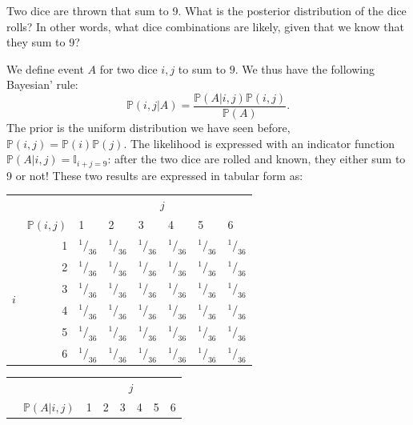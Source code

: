 \documentclass{article}
\begin{document}
\begin{testexample}
    Two dice are thrown that sum to 9. What is the posterior distribution of the dice rolls? In other words, what dice combinations are likely, given that we know that they sum to 9?
    
    We define event $A$ for two dice $i,j$ to sum to $9$. We thus have the following Bayesian' rule:
    \begin{equation}
        \mathbb{P}(i,j|A) = \frac{ \mathbb{P}(A|i,j)\mathbb{P}(i,j)}{\mathbb{P}(A)}.
    \end{equation}
    The prior is the uniform distribution we have seen before, $\mathbb{P}(i,j)=\mathbb{P}(i)\mathbb{P}(j)$. The likelihood is expressed with an indicator function $\mathbb{P}(A|i,j)=\mathbb{I}_{i+j=9}$: after the two dice are rolled and known, they either sum to 9 or not! These two results are expressed in tabular form as:
    \begin{center}
    \hfill
\begin{tabular}{@{}lr|llllll}
\toprule
 & & \multicolumn{6}{c}{$j$} \\ 
 &$\mathbb{P}(i,j)$ & 1 & 2 & 3 & 4 & 5 & 6 \\ \hline
\multirow{6}{*}{$i$} & 1 & $^{1\!}/_{\! 36}$ & $^{1\!}/_{\! 36}$ & $^{1\!}/_{\! 36}$ & $^{1\!}/_{\! 36}$ & $^{1\!}/_{\! 36}$ & $^{1\!}/_{\! 36}$ \\
 & 2 & $^{1\!}/_{\! 36}$ & $^{1\!}/_{\! 36}$ & $^{1\!}/_{\! 36}$ & $^{1\!}/_{\! 36}$ & $^{1\!}/_{\! 36}$ & $^{1\!}/_{\! 36}$ \\
 & 3 & $^{1\!}/_{\! 36}$ & $^{1\!}/_{\! 36}$ & $^{1\!}/_{\! 36}$ & $^{1\!}/_{\! 36}$ & $^{1\!}/_{\! 36}$ & $^{1\!}/_{\! 36}$ \\
 & 4 & $^{1\!}/_{\! 36}$ & $^{1\!}/_{\! 36}$ & $^{1\!}/_{\! 36}$ & $^{1\!}/_{\! 36}$ & $^{1\!}/_{\! 36}$ & $^{1\!}/_{\! 36}$ \\
 & 5 & $^{1\!}/_{\! 36}$ & $^{1\!}/_{\! 36}$ & $^{1\!}/_{\! 36}$ & $^{1\!}/_{\! 36}$ & $^{1\!}/_{\! 36}$ & $^{1\!}/_{\! 36}$ \\
 & 6 & $^{1\!}/_{\! 36}$ & $^{1\!}/_{\! 36}$ & $^{1\!}/_{\! 36}$ & $^{1\!}/_{\! 36}$ & $^{1\!}/_{\! 36}$ & $^{1\!}/_{\! 36}$ \\ \bottomrule
\end{tabular}
\hfill
\begin{tabular}{@{}lr|llllll}
\toprule
 & & \multicolumn{6}{c}{$j$} \\ 
 & $\mathbb{P}(A|i,j)$ & 1 & 2 & 3 & 4 & 5 & 6 \\ \hline

\end{tabular}
\end{center}
\end{testexample}
\end{document}
